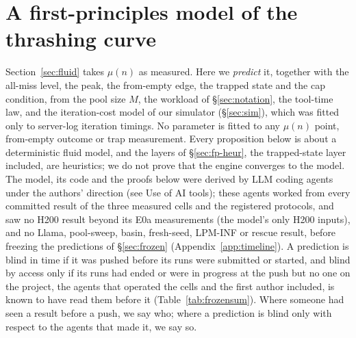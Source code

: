 \section{A first-principles model of the thrashing curve}\label{sec:fp}

Section~\ref{sec:fluid} takes $\mu(n)$ as measured. Here we \emph{predict} it, together with the all-miss level, the peak, the from-empty edge, the trapped state and the cap condition, from the pool size $M$, the workload of \S\ref{sec:notation}, the tool-time law, and the iteration-cost model of our simulator (\S\ref{sec:sim}), which was fitted only to server-log iteration timings. No parameter is fitted to any $\mu(n)$ point, from-empty outcome or trap measurement. Every proposition below is about a deterministic fluid model, and the layers of \S\ref{sec:fp-heur}, the trapped-state layer included, are heuristics; we do not prove that the engine converges to the model. The model, its code and the proofs below were derived by LLM coding agents under the authors' direction (see Use of AI tools); these agents worked from every committed result of the three measured cells and the registered protocols, and saw no H200 result beyond its E0a measurements (the model's only H200 inputs), and no Llama, pool-sweep, basin, fresh-seed, LPM-INF or rescue result, before freezing the predictions of \S\ref{sec:frozen} (Appendix~\ref{app:timeline}). A prediction is blind in time if it was pushed before its runs were submitted or started, and blind by access only if its runs had ended or were in progress at the push but no one on the project, the agents that operated the cells and the first author included, is known to have read them before it (Table~\ref{tab:frozensum}). Where someone had seen a result before a push, we say who; where a prediction is blind only with respect to the agents that made it, we say so.

